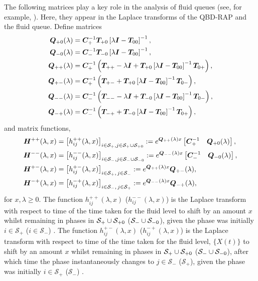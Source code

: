 The following matrices play a key role in the analysis of fluid queues (see, for example, \cite{bean2009,dasilva2005}). Here, they appear in the Laplace transforms of the QBD-RAP and the fluid queue. Define matrices
\begin{align*}
	\boldsymbol Q_{+0}(\lambda) &= \boldsymbol C_+^{-1}\boldsymbol T_{+0}\left[\lambda \boldsymbol I - \boldsymbol T_{00}\right]^{-1},
	\\\boldsymbol Q_{-0}(\lambda) &= \boldsymbol C_-^{-1}\boldsymbol T_{-0}\left[\lambda \boldsymbol I - \boldsymbol T_{00}\right]^{-1},
	\\\boldsymbol Q_{++}(\lambda) &= \boldsymbol C_+^{-1} \left(\boldsymbol T_{++} - \lambda \boldsymbol I + \boldsymbol T_{+0}\left[\lambda \boldsymbol I - \boldsymbol T_{00}\right]^{-1}\boldsymbol T_{0+}\right),
	\\\boldsymbol Q_{+-}(\lambda) &= \boldsymbol C_+^{-1} \left(\boldsymbol T_{+-} + \boldsymbol T_{+0}\left[\lambda \boldsymbol I - \boldsymbol T_{00}\right]^{-1}\boldsymbol T_{0-} \right) ,
	\\\boldsymbol Q_{--}(\lambda) &= \boldsymbol C_-^{-1} \left(\boldsymbol T_{--}  - \lambda \boldsymbol I + \boldsymbol T_{-0}\left[\lambda \boldsymbol I - \boldsymbol T_{00}\right]^{-1}\boldsymbol T_{0-}\right),
	\\\boldsymbol Q_{-+}(\lambda) &=\boldsymbol C_-^{-1} \left(\boldsymbol T_{-+}+ \boldsymbol T_{-0}\left[\lambda \boldsymbol I - \boldsymbol T_{00}\right]^{-1}\boldsymbol T_{0+}\right) ,
\end{align*}
and matrix functions,
\begin{align}
	\boldsymbol H^{++}(\lambda,x)&= \left[h_{ij}^{++}(\lambda,x)\right]_{i\in \mathcal S_+,j\in\mathcal S_{+}\cup\mathcal{S}_{+0}} := e^{\boldsymbol{Q}_{++}(\lambda)x}\begin{bmatrix} \boldsymbol C_+^{-1} & \boldsymbol Q_{+0}(\lambda) \end{bmatrix},  \label{eqn: lst 1}
	\\\boldsymbol H^{--}(\lambda,x) &= \left[h_{ij}^{--}(\lambda,x)\right]_{i\in\mathcal S_-,j\in\mathcal S_{-}\cup\mathcal{S}_{-0}}:= e^{\boldsymbol{Q}_{--}(\lambda)x}\begin{bmatrix} \boldsymbol C_-^{-1} & \boldsymbol Q_{-0}(\lambda) \end{bmatrix},
	\\\boldsymbol H^{+-}(\lambda,x)  &= \left[h_{ij}^{+-}(\lambda,x)\right]_{i\in\mathcal S_+,\,j\in\mathcal S_-}:= e^{\boldsymbol{Q}_{++}(\lambda)x}\boldsymbol{Q}_{+-}(\lambda), 
	\\\boldsymbol H^{-+}(\lambda,x)&= \left[h_{ij}^{-+}(\lambda,x)\right]_{i\in\mathcal S_-,\, j\in\mathcal S_+} := e^{\boldsymbol{Q}_{--}(\lambda)x}\boldsymbol{Q}_{-+}(\lambda) , \label{eqn: lst 4}
\end{align}
for \(x,\lambda\geq 0\). The function \(h_{ij}^{++}(\lambda,x)\) (\(h_{ij}^{--}(\lambda,x)\)) is the Laplace transform with respect to time of the time taken for the fluid level to shift by an amount \(x\) whilst remaining in phases in \(\mathcal S_+\cup\mathcal{S}_{+0}\) (\(\mathcal S_-\cup\mathcal{S}_{-0}\)), given the phase was initially \(i\in\mathcal S_+\) (\(i\in\mathcal S_-\)) \citep{bean2005}. The function \(h_{ij}^{+-}(\lambda,x)\) (\(h_{ij}^{-+}(\lambda,x)\)) is the Laplace transform with respect to time of the time taken for the fluid level, \(\{X(t)\}\) to shift by an amount \(x\) whilst remaining in phases in \(\mathcal S_+\cup\mathcal{S}_{+0}\) (\(\mathcal S_-\cup\mathcal{S}_{-0}\)), after which time the phase instantaneously changes to \(j\in\mathcal S_-\) (\(\mathcal S_+\)), given the phase was initially \(i\in\mathcal S_+\) (\(\mathcal S_-\)) \citep{bean2005}.

